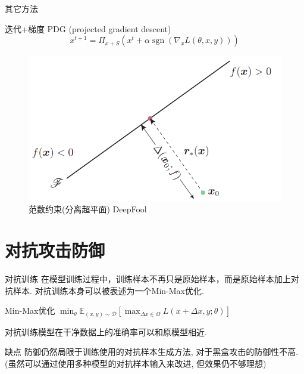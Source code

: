 \documentclass[UTF8, aspectratio=169, 10pt, t]{ctexbeamer}
\begin{document}
\begin{frame}{其它方法}
	\begin{block}{迭代+梯度 PDG (projected gradient descent)}
		\[x^{t+1} = \Pi_{x+S} \left( x^t +
		\alpha\operatorname{sgn}(\nabla_x L(\theta,x,y))\right)\]
	\end{block} 
	\begin{figure}
		\centering
		\includegraphics[height=0.45\textheight]{deepfool}
		\caption{范数约束(分离超平面) DeepFool}
		\label{fig:deepfool}
	\end{figure}
	
\end{frame}

\section{对抗攻击防御}

\begin{frame}{对抗训练}
	在模型训练过程中，训练样本不再只是原始样本，而是原始样本加上对抗样本. 对抗训练本身可以被表述为一个Min-Max优化.
	
	\begin{block}{Min-Max优化}
		$\min_{\theta}\mathbb{E}_{(x,y)\sim\mathcal{D}}\left[\max_{\Delta x\in\Omega}L(x+\Delta x, y;\theta)\right]$
	\end{block}
	对抗训练模型在干净数据上的准确率可以和原模型相近.
	\begin{alertblock}{缺点}
		防御仍然局限于训练使用的对抗样本生成方法, 对于黑盒攻击的防御性不高. (虽然可以通过使用多种模型的对抗样本输入来改进, 但效果仍不够理想)
	\end{alertblock}
	
\end{frame}
\end{document}
